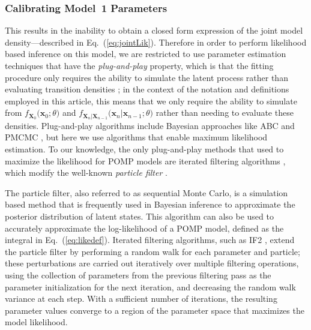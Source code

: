 \documentclass[10pt,letterpaper]{article}\usepackage[]{graphicx}\usepackage[table]{xcolor}
\newcommand\paramVec{\theta}
\newcommand\myeqref[1]{(\ref{#1})}
\begin{document}
\subsubsection*{Calibrating Model~1 Parameters}\label{sec:fit1}

This results in the inability to obtain a closed form expression of the  joint model density---described in Eq.~\myeqref{eq:jointLik}.
Therefore in order to perform likelihood based inference on this model, we are restricted to use parameter estimation techniques that have the \emph{plug-and-play} property, which is that the fitting procedure only requires the ability to simulate the latent process rather than evaluating transition densities \cite{breto09,he10};
in the context of the notation and definitions employed in this article, this means that we only require the ability to simulate from $f_{\bm{X}_0}\big(\bm{x}_0;\paramVec\big)$ and $f_{\bm{X}_n|\bm{X}_{n-1}}\big(\bm{x}_{n}|\bm{x}_{n-1}; \paramVec\big)$ rather than needing to evaluate these densities.
Plug-and-play algorithms include Bayesian approaches like ABC and PMCMC \cite{toni09,andrieu10}, but here we use algorithms that enable maximum likelihood estimation.
To our knowledge, the only plug-and-play methods that   used to maximize the likelihood for  POMP models  are iterated filtering algorithms \cite{ionides15}, which modify the well-known \emph{particle filter} \cite{arulampalam02}.

The particle filter, also referred to as sequential Monte Carlo, is a simulation based method that is frequently used in Bayesian inference to approximate the posterior distribution of latent states.
This algorithm can also be used to accurately approximate the log-likelihood of a POMP model, defined as the integral in Eq.~\myeqref{eq:likedef}.
Iterated filtering algorithms, such as IF2 \cite{ionides15}, extend the particle filter by performing a random walk for each parameter and particle;
these perturbations are carried out iteratively over multiple filtering operations, using the collection of parameters from the previous filtering pass as the parameter initialization for the next iteration, and decreasing the random walk variance at each step.
With a sufficient number of iterations, the resulting parameter values converge to a region of the parameter space that maximizes the model likelihood.
\end{document}
